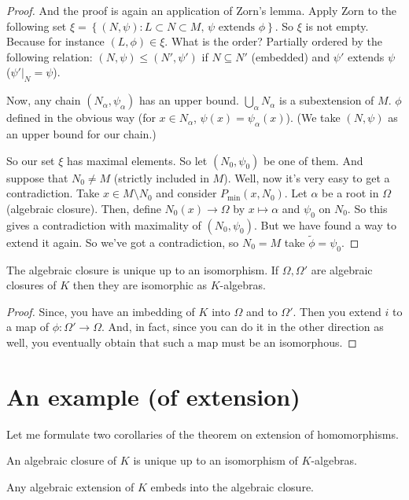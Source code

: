 \begin{proof}
And the proof is again an application of Zorn's lemma. Apply Zorn to the following set $\xi=\left\{ (N,\psi): L\subset N\subset M \text{, }\psi\text{ extends }\phi\right\}$. So $\xi$ is not empty. Because for instance $(L, \phi)\in \xi$. What is the order? Partially ordered by the following relation: $(N, \psi)\leq (N', \psi')$ if $N \subseteq N'$ (embedded) and $\psi'$ extends $\psi$ ($\psi'|_N=\psi$).

Now, any chain $(N_{\alpha}, \psi_{\alpha})$ has an upper bound. $\bigcup_{\alpha}N_{\alpha}$ is a subextension of $M$. $\phi$ defined in the obvious way (for $x \in N_{\alpha}$, $\psi(x)=\psi_{\alpha}(x)$). (We take $(N, \psi)$ as an upper bound for our chain.)

So our set $\xi$ has maximal elements. So let $(N_0,\psi_0)$ be one of them. And suppose that $N_0\neq M$ (strictly included in $M$). Well, now it's very easy to get a contradiction. Take $x \in M\setminus N_0$  and consider $P_{\text{min}}(x,N_0)$. Let $\alpha$ be a root in $\Omega$ (algebraic closure). Then, define $N_0(x)\to \Omega$ by $x \mapsto \alpha$ and $\psi_0$ on $N_0$. So this gives a contradiction with maximality of $(N_0, \psi_0)$. But we have found a way to extend it again. So we've got a contradiction, so $N_0 = M$ take $\widetilde{\phi} = \psi_0$.
\end{proof}

\begin{corollary}
The algebraic closure is unique up to an isomorphism. If $\Omega, \Omega'$ are algebraic closures of $K$ then they are isomorphic as $K$-algebras.
\end{corollary}

\begin{proof}
Since, you have an imbedding of $K$ into $\Omega$ and to $\Omega'$. Then you extend $i$ to a map of $\phi: \Omega' \to \Omega$. And, in fact, since you can do it in the other direction as well, you eventually obtain that such a map must be an isomorphous. 
\end{proof} 

\section{An example (of extension)}

Let me formulate two corollaries of the theorem on extension of homomorphisms. 

\begin{corollary}
An algebraic closure of $K$ is unique up to an isomorphism of $K$-algebras.
\end{corollary}
\begin{corollary}
Any algebraic extension of $K$ embeds into the algebraic closure. 
\end{corollary}

